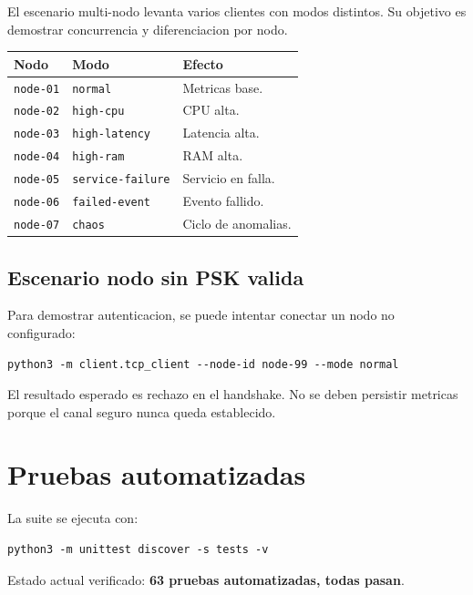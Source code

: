 \documentclass[11pt,letterpaper]{article}
\begin{document}
El escenario multi-nodo levanta varios clientes con modos distintos. Su objetivo
es demostrar concurrencia y diferenciacion por nodo.

\begin{longtable}{|p{}|p{}|p{}|}
\hline
\textbf{Nodo} & \textbf{Modo} & \textbf{Efecto} \\
\hline
\texttt{node-01} & \texttt{normal} & Metricas base. \\
\hline
\texttt{node-02} & \texttt{high-cpu} & CPU alta. \\
\hline
\texttt{node-03} & \texttt{high-latency} & Latencia alta. \\
\hline
\texttt{node-04} & \texttt{high-ram} & RAM alta. \\
\hline
\texttt{node-05} & \texttt{service-failure} & Servicio en falla. \\
\hline
\texttt{node-06} & \texttt{failed-event} & Evento fallido. \\
\hline
\texttt{node-07} & \texttt{chaos} & Ciclo de anomalias. \\
\hline
\end{longtable}

\subsection{Escenario nodo sin PSK valida}

Para demostrar autenticacion, se puede intentar conectar un nodo no configurado:

\begin{lstlisting}[style=terminal]
python3 -m client.tcp_client --node-id node-99 --mode normal
\end{lstlisting}

El resultado esperado es rechazo en el handshake. No se deben persistir metricas
porque el canal seguro nunca queda establecido.

\newpage
\section{Pruebas automatizadas}

La suite se ejecuta con:

\begin{lstlisting}[style=terminal]
python3 -m unittest discover -s tests -v
\end{lstlisting}

Estado actual verificado: \textbf{63 pruebas automatizadas, todas pasan}.
\end{document}
